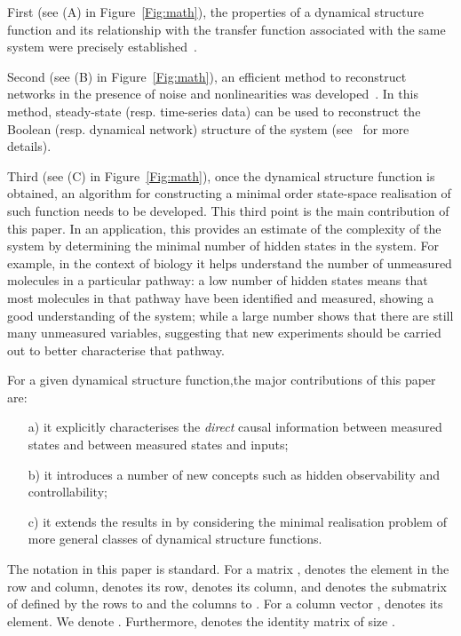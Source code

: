 \documentclass[twocolumn,12pt]{autart}
\theoremstyle{plain}
\begin{document}
First (see (A) in Figure~\ref{Fig:math}), the properties of a dynamical
structure function and its relationship with the transfer
function associated with the same system were precisely established~\cite{08net_rec}.


Second (see (B) in Figure~\ref{Fig:math}), an efficient method to reconstruct networks in the presence of noise and nonlinearities was developed~\cite{robust}.
In this method, steady-state (resp. time-series data) can be used to reconstruct the Boolean (resp. dynamical network) structure of the system (see~\cite{robust} for more details). 

Third (see (C) in Figure~\ref{Fig:math}), once the dynamical structure function is obtained, an algorithm for constructing a minimal order state-space realisation of such function needs to be developed. This third point is the main contribution of this paper. In an application, this provides an estimate of the complexity of the system by determining the minimal number of hidden states in the system. For example, in the context of biology it helps understand the number of unmeasured molecules in a particular pathway: a low number of hidden states means that most molecules in that pathway have been identified and measured, showing a good understanding of the system; while a large number shows that there are still many unmeasured variables, suggesting that new experiments should be carried out to better characterise that pathway.

For a given dynamical structure function,the major contributions of this paper are: 
\begin{itemize} 
\item[a)]  it explicitly characterises the {\em direct} causal information between measured states and between measured states and inputs;
\item[b)] it introduces a number of new concepts such as hidden observability and controllability; 
\item[c)] it extends the results in \cite{yetac} by considering the minimal realisation problem of more general classes of dynamical structure functions. 
\end{itemize} 

The notation in this paper is standard. For a matrix ,  denotes the element in the  row and 
column,  denotes its 
row,  denotes its 
column, and  
denotes the submatrix of  defined by the rows  to  and the columns  to .
For a column vector , 
denotes its  element. 
We denote . Furthermore, 
 denotes the identity matrix of size .
\end{document}

